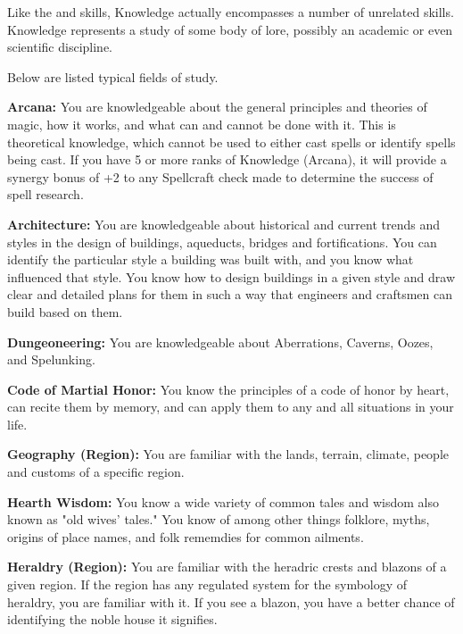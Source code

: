 
Like the  and  skills, Knowledge actually encompasses a number of unrelated skills. Knowledge represents a study of some body of lore, possibly an academic or even scientific discipline.

Below are listed typical fields of study.

\begin{itemize*}
	\item \textbf{Arcana:} You are knowledgeable about the general principles and theories of magic, how it works, and what can and cannot be done with it. This is theoretical knowledge, which cannot be used to either cast spells or identify spells being cast. If you have 5 or more ranks of Knowledge (Arcana), it will provide a synergy bonus of +2 to any Spellcraft check made to determine the success of spell research.
	\item \textbf{Architecture:} You are knowledgeable about historical and current trends and styles in the design of buildings, aqueducts, bridges and fortifications. You can identify the particular style a building was built with, and you know what influenced that style. You know how to design buildings in a given style and draw clear and detailed plans for them in such a way that engineers and craftsmen can build based on them.
	\item \textbf{Dungeoneering:} You are knowledgeable about Aberrations, Caverns, Oozes, and Spelunking.
	\item \textbf{Code of Martial Honor:} You know the principles of a code of honor by heart, can recite them by memory, and can apply them to any and all situations in your life.
	\item \textbf{Geography (Region):} You are familiar with the lands, terrain, climate, people and customs of a specific region.
	\item \textbf{Hearth Wisdom:} You know a wide variety of common tales and wisdom also known as "old wives' tales." You know of among other things folklore, myths, origins of place names, and folk rememdies for common ailments.
	\item \textbf{Heraldry (Region):} You are familiar with the heradric crests and blazons of a given region. If the region has any regulated system for the symbology of heraldry, you are familiar with it. If you see a blazon, you have a better chance of identifying the noble house it signifies.

\end{itemize*}

